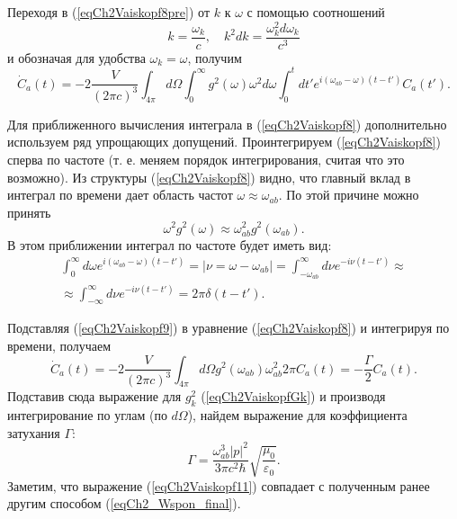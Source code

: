Переходя в (\ref{eqCh2Vaiskopf8pre}) от $k$ к $\omega$ с помощью соотношений 
\begin{equation}
k = \frac{\omega_k}{c}, \quad k^2 dk = \frac{\omega_k^2 d \omega_k}{c^3}
\nonumber
\end{equation}
и обозначая для удобства \(\omega_k = \omega\),
получим
\begin{equation}
\dot{C}_{a}\left(t\right) = - 
2 \frac{V}{\left(2 \pi c\right)^3} \int_{4\pi}d \Omega \int_0^{\infty}
g^2\left(\omega\right) \omega^2 d\omega  \int_0^t dt'
e^{i \left(\omega_{ab} - \omega\right)\left(t - t'\right)}  
C_{a}\left(t'\right).
\label{eqCh2Vaiskopf8}
\end{equation}

Для приближенного вычисления интеграла в (\ref{eqCh2Vaiskopf8})
дополнительно используем ряд упрощающих допущений.
Проинтегрируем (\ref{eqCh2Vaiskopf8}) сперва по частоте (т. е. меняем
порядок интегрирования, считая что это возможно). Из структуры 
(\ref{eqCh2Vaiskopf8}) видно, что главный вклад в интеграл по времени
дает область частот $\omega \approx \omega_{ab}$. По этой причине
можно принять 
\[
\omega^2 g^2\left(\omega\right) \approx 
\omega_{ab}^2 g^2\left(\omega_{ab}\right).
\]
В этом приближении интеграл по частоте будет иметь вид:
\begin{eqnarray}
\int_0^{\infty}d \omega e^{i\left(\omega_{ab} - \omega\right)\left(t -
  t'\right)}  = \left|\nu = \omega - \omega_{ab}\right| =
\int_{- \omega_{ab}}^{\infty}d \nu e^{-i \nu\left(t - t'\right)} \approx
\nonumber \\
\approx \int_{- \infty}^{\infty} d \nu e^{-i \nu\left(t - t'\right)} = 
2 \pi \delta\left(t - t'\right).
\label{eqCh2Vaiskopf9}
\end{eqnarray}

Подставляя (\ref{eqCh2Vaiskopf9}) в уравнение (\ref{eqCh2Vaiskopf8}) и
интегрируя по времени, получаем
\begin{equation}
\dot{C}_{a}\left(t\right) = - 
2 \frac{V}{\left(2 \pi c\right)^3} \int_{4\pi}d \Omega 
g^2\left(\omega_{ab}\right) \omega_{ab}^2   
2 \pi C_{a}\left(t\right) = - \frac{\Gamma}{2} C_{a}\left(t\right).
\label{eqCh2Vaiskopf10}
\end{equation}
Подставив сюда выражение для $g_k^2$ (\ref{eqCh2VaiskopfGk}) и
производя интегрирование по углам (по $d \Omega$), найдем выражение для
коэффициента затухания $\Gamma$:
\begin{equation}
\Gamma = \frac{\omega_{ab}^3 \left|p\right|^2}{3 \pi c^2 \hbar}
\sqrt{\frac{\mu_0}{\varepsilon_0}}. 
\label{eqCh2Vaiskopf11}
\end{equation}
Заметим, что выражение (\ref{eqCh2Vaiskopf11}) совпадает с полученным
ранее другим способом (\ref{eqCh2_Wspon_final}).

